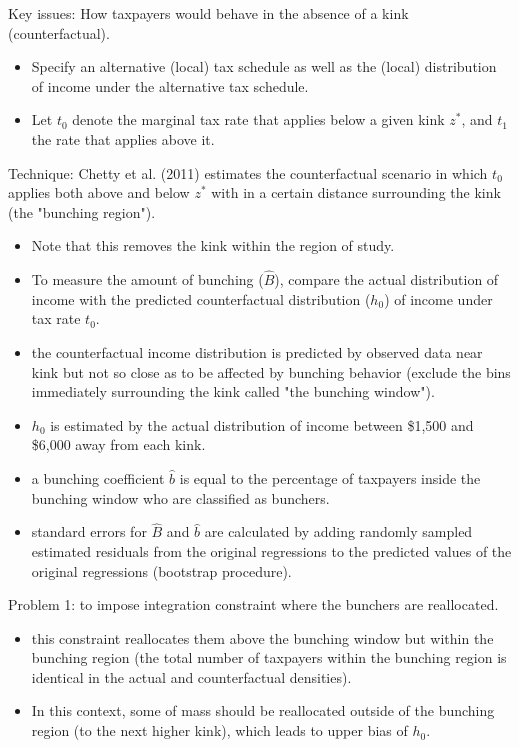 \documentclass[../root]{subfiles}
\begin{document}
    Key issues: How taxpayers would behave in the absence of a kink (counterfactual).
    \begin{itemize}
        \item Specify an alternative (local) tax schedule as well as the (local) distribution of income under the alternative tax schedule.
        \item Let $t_0$ denote the marginal tax rate that applies below a given kink $z^*$, and $t_1$ the rate that applies above it.
    \end{itemize}
    Technique: Chetty et al. (2011) estimates the counterfactual scenario in which $t_0$ applies both above and below $z^*$ with in a certain distance surrounding the kink (the "bunching region").
    \begin{itemize}
        \item Note that this removes the kink within the region of study.
        \item To measure the amount of bunching ($\hat{B}$), compare the actual distribution of income with the predicted counterfactual distribution ($h_0$) of income under tax rate $t_0$.
        \item the counterfactual income distribution is predicted by observed data near kink but not so close as to be affected by bunching behavior (exclude the bins immediately surrounding the kink called "the bunching window").
        \item $h_0$ is estimated by the actual distribution of income between \$1,500 and \$6,000 away from each kink. 
        \item a bunching coefficient $\hat{b}$ is equal to the percentage of taxpayers inside the bunching window who are classified as bunchers. 
        \item standard errors for $\hat{B}$ and $\hat{b}$ are calculated by adding randomly sampled estimated residuals from the original regressions to the predicted values of the original regressions (bootstrap procedure).
    \end{itemize}
    Problem 1: to impose integration constraint where the bunchers are reallocated.
    \begin{itemize}
        \item this constraint reallocates them above the bunching window but within the bunching region (the total number of taxpayers within the bunching region is identical in the actual and counterfactual densities).
        \item In this context, some of mass should be reallocated outside of the bunching region (to the next higher kink), which leads to upper bias of $h_0$.
    \end{itemize}
\end{document}
